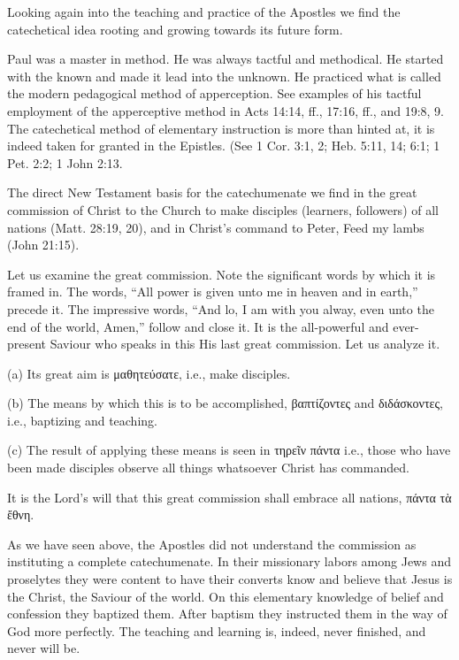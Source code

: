 Looking again into the teaching and practice of the Apostles we find the catechetical idea rooting and growing towards its future form.

Paul was a master in method. He was always tactful and methodical. He started with the known and made it lead into the unknown. He practiced  what is called the modern pedagogical method of apperception. See examples of his tactful employment of the apperceptive method in Acts 14:14, ff., 17:16, ff., and 19:8, 9. The catechetical method of elementary instruction is more than hinted at, it is indeed taken for granted in the Epistles. (See 1 Cor. 3:1, 2; Heb. 5:11, 14; 6:1; 1 Pet. 2:2; 1 John 2:13.


 The direct New Testament basis for the catechumenate we find in the great commission of Christ to the Church to make disciples (learners, followers) of all nations (Matt. 28:19, 20), and in Christ’s command to Peter, Feed my lambs (John 21:15).


Let us examine the great commission. Note the significant words by which it is framed in. The words, “All power is given unto me in heaven and in earth,” precede it. The impressive words, “And
lo, I am with you alway, even unto the end of the world, Amen,” follow and close it. It is the all-powerful and ever-present Saviour who speaks in this His last great commission. Let us analyze it.

(a) Its great aim is μαθητεύσατε, i.e., make disciples.

(b) The means by which this is to be accomplished, βαπτίζοντες and διδάσκοντες, i.e., baptizing and teaching.

(c) The result of applying these means is seen in τηρεῖν πάντα i.e., those who have been made disciples observe all things whatsoever Christ has commanded.

It is the Lord’s will that this great commission shall embrace all nations, πάντα τὰ ἔθνη.

As we have seen above, the Apostles did not understand the commission as instituting a complete catechumenate. In their missionary labors among Jews and proselytes they were content to have their converts know and believe that Jesus is the Christ, the Saviour of the world. On this elementary knowledge of belief and confession they baptized them. After baptism they instructed them in the way of God more perfectly. The teaching and learning is, indeed, never finished, and never will be.

